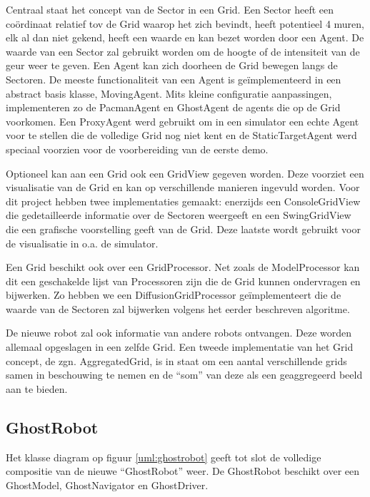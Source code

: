 \documentclass[12pt,a4paper]{report}
\begin{document}
Centraal staat het concept van de Sector in een Grid. Een Sector heeft een co\"ordinaat relatief tov de Grid waarop het zich bevindt, heeft potentieel 4 muren, elk al dan niet gekend, heeft een waarde en kan bezet worden door een Agent. De waarde van een Sector zal gebruikt worden om de hoogte of de intensiteit van de geur weer te geven. Een Agent kan zich doorheen de Grid bewegen langs de Sectoren. De meeste functionaliteit van een Agent is ge\"implementeerd in een abstract basis klasse, MovingAgent. Mits kleine configuratie aanpassingen, implementeren zo de PacmanAgent en GhostAgent de agents die op de Grid voorkomen. Een ProxyAgent werd gebruikt om in een simulator een echte Agent voor te stellen die de volledige Grid nog niet kent en de StaticTargetAgent werd speciaal voorzien voor de voorbereiding van de eerste demo.

Optioneel kan aan een Grid ook een GridView gegeven worden. Deze voorziet een visualisatie van de Grid en kan op verschillende manieren ingevuld worden. Voor dit project hebben twee implementaties gemaakt: enerzijds een ConsoleGridView die gedetailleerde informatie over de Sectoren weergeeft en een SwingGridView die een grafische voorstelling geeft van de Grid. Deze laatste wordt gebruikt voor de visualisatie in o.a. de simulator.

Een Grid beschikt ook over een GridProcessor. Net zoals de ModelProcessor kan dit een geschakelde lijst van Processoren zijn die de Grid kunnen ondervragen en bijwerken. Zo hebben we een DiffusionGridProcessor ge\"implementeert die de waarde van de Sectoren zal bijwerken volgens het eerder beschreven algoritme.

De nieuwe robot zal ook informatie van andere robots ontvangen. Deze worden allemaal opgeslagen in een zelfde Grid. Een tweede implementatie van het Grid concept, de zgn. AggregatedGrid, is in staat om een aantal verschillende grids samen in beschouwing te nemen en de ``som'' van deze als een geaggregeerd beeld aan te bieden.

\subsection{GhostRobot}

Het klasse diagram op figuur \ref{uml:ghostrobot} geeft tot slot de volledige compositie van de nieuwe ``GhostRobot'' weer. De GhostRobot beschikt over een GhostModel, GhostNavigator en GhostDriver.
\end{document}
